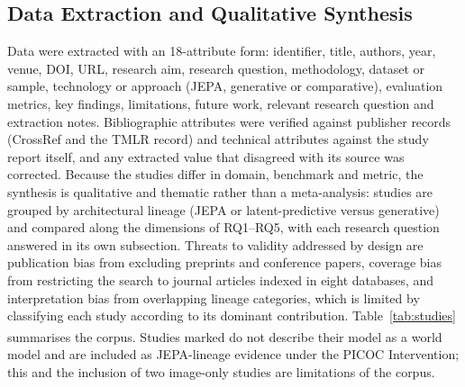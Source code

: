 \documentclass[conference,a4paper]{IEEEtran}
\begin{document}
\subsection{Data Extraction and Qualitative Synthesis}
Data were extracted with an 18-attribute form: identifier, title, authors, year, venue, DOI, URL, research aim, research question, methodology, dataset or sample, technology or approach (JEPA, generative or comparative), evaluation metrics, key findings, limitations, future work, relevant research question and extraction notes. Bibliographic attributes were verified against publisher records (CrossRef and the TMLR record) and technical attributes against the study report itself, and any extracted value that disagreed with its source was corrected. %
Because the studies differ in domain, benchmark and metric, the synthesis is qualitative and thematic rather than a meta-analysis: studies are grouped by architectural lineage (JEPA or latent-predictive versus generative) and compared along the dimensions of RQ1--RQ5, with each research question answered in its own subsection. Threats to validity addressed by design are publication bias from excluding preprints and conference papers, coverage bias from restricting the search to journal articles indexed in eight databases, and interpretation bias from overlapping lineage categories, which is limited by classifying each study according to its dominant contribution. Table~\ref{tab:studies} summarises the corpus. Studies marked \textsuperscript{\dag} do not describe their model as a world model and are included as JEPA-lineage evidence under the PICOC Intervention; this and the inclusion of two image-only studies are limitations of the corpus.
\end{document}
